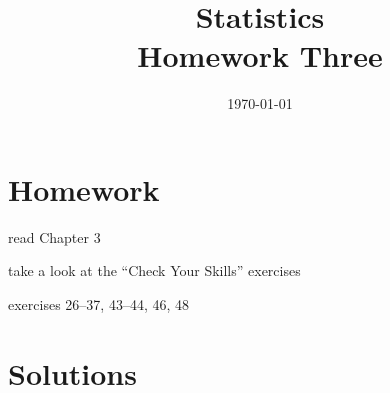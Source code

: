 \documentclass[letterpaper, landscape]{exam}
\title{Statistics \\ Homework Three}
\date{\today}
\author{}
\begin{document}
  \maketitle

  \section{Homework}
    \begin{itemize*}
      \item read Chapter 3 
      \item take a look at the ``Check Your Skills'' exercises
      \item exercises 26--37, 43--44, 46, 48
    \end{itemize*}

    \ifprintanswers{}
  \section{Solutions}
\end{document}
